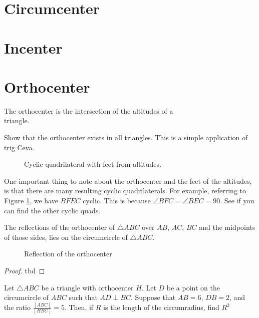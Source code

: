 \documentclass[11pt]{scrartcl}
\theoremstyle{plain}
\begin{document}
\section{Circumcenter}
\section{Incenter}
\section{Orthocenter}

    \begin{definition}
        The orthocenter is the intersection of the altitudes of a \\triangle.
   \end{definition} 

\begin{exercise}
    Show that the orthocenter exists in all triangles. This is a simple application of trig Ceva.
\end{exercise}


\begin{figure}[H]
    \centering
    \scalebox{.75}{}
    \caption{Cyclic quadrilateral with feet from altitudes.}
    \label{fig:cyclic_orthocenter}
\end{figure}

One important thing to note about the orthocenter and the feet of the altitudes, is that there are many resulting cyclic quadrilaterals.
For example, referring to Figure \ref{fig:cyclic_orthocenter}, we have $BFEC$ cyclic. This is because $\angle BFC = \angle BEC = 90$.
See if you can find the other cyclic quads.\\
\begin{theorem}\label{reflecting_the_orthocenter}
    The reflections of the orthocenter of $\triangle ABC$ over $AB$, $AC$, $BC$ and the midpoints of those sides, lies on the circumcircle of $\triangle ABC$.
\end{theorem} 
\begin{figure}[H]
    \centering
    \scalebox{.75}{}
    \caption{Reflection of the orthocenter}
    \label{fig:reflection_orthocenter}
\end{figure}
\begin{proof}
    tbd
\end{proof}

\begin{example}[Pumac 2019]
    Let $\triangle ABC$ be a triangle with orthocenter $H$. Let $D$ be a point on the circumcircle
    of $ABC$ such that $AD \perp BC$. Suppose that $AB=6$, $DB=2$, and the ratio $\frac{[ABC]}{[HBC]}=5$. Then, if $R$
    is the length of the circumradius, find $R^2$
\end{example}
\end{document}
